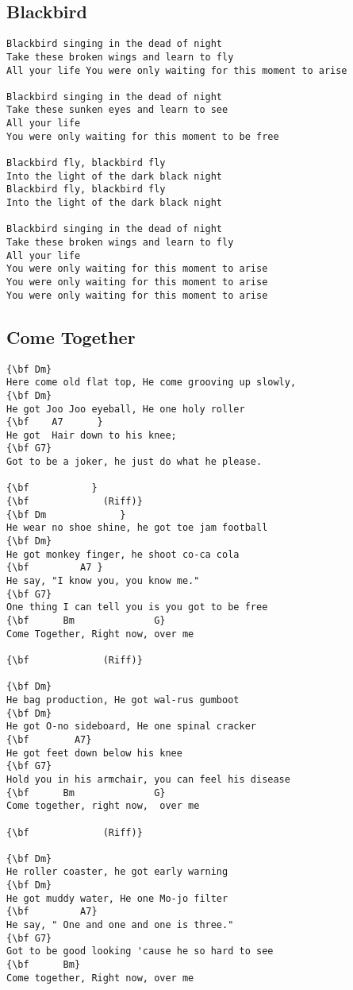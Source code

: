 \documentclass[a4paper]{article}
\begin{document}
\subsection{Blackbird} %
\label{sub:Blackbir}
\begin{Verbatim}[commandchars=\\\{\}]
Blackbird singing in the dead of night 
Take these broken wings and learn to fly 
All your life You were only waiting for this moment to arise

Blackbird singing in the dead of night 
Take these sunken eyes and learn to see 
All your life 
You were only waiting for this moment to be free

Blackbird fly, blackbird fly 
Into the light of the dark black night
Blackbird fly, blackbird fly 
Into the light of the dark black night

Blackbird singing in the dead of night 
Take these broken wings and learn to fly 
All your life 
You were only waiting for this moment to arise 
You were only waiting for this moment to arise 
You were only waiting for this moment to arise 
\end{Verbatim}
\newpage
\subsection{Come Together} %
\label{sub:Come Together}
\begin{Verbatim}[commandchars=\\\{\}]
{\bf Dm}
Here come old flat top, He come grooving up slowly,
{\bf Dm}
He got Joo Joo eyeball, He one holy roller 
{\bf 	A7		}
He got  Hair down to his knee;  
{\bf G7}
Got to be a joker, he just do what he please.

{\bf           }
{\bf 			 (Riff)}
{\bf Dm 			}
He wear no shoe shine, he got toe jam football
{\bf Dm}
He got monkey finger, he shoot co-ca cola
{\bf         A7 }
He say, "I know you, you know me."  
{\bf G7}
One thing I can tell you is you got to be free
{\bf      Bm              G}
Come Together, Right now, over me

{\bf 			 (Riff)}

{\bf Dm}
He bag production, He got wal-rus gumboot
{\bf Dm}
He got O-no sideboard, He one spinal cracker
{\bf        A7}
He got feet down below his knee
{\bf G7}
Hold you in his armchair, you can feel his disease 
{\bf      Bm              G}
Come together, right now,  over me

{\bf 			 (Riff)}

{\bf Dm}
He roller coaster, he got early warning
{\bf Dm}
He got muddy water, He one Mo-jo filter
{\bf         A7}
He say, " One and one and one is three."
{\bf G7}
Got to be good looking 'cause he so hard to see 
{\bf      Bm}
Come together, Right now, over me
\end{Verbatim}
\newpage
\end{document}
